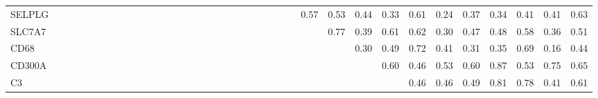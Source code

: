 \begin{longtable}{lrrrrrrrrrrrrrrrrrrrrrrrrrrrrrrrrrrrr}
SELPLG    &            &            &              &            &              &              &                 &               &              &            &           &             &              &             &            &             &              &           &           &              &               &            &               &               &              &         0.57 &       0.53 &         0.44 &     0.33 &         0.61 &          0.24 &        0.37 &      0.34 &        0.41 &        0.41 &        0.63 \\
SLC7A7    &            &            &              &            &              &              &                 &               &              &            &           &             &              &             &            &             &              &           &           &              &               &            &               &               &              &              &       0.77 &         0.39 &     0.61 &         0.62 &          0.30 &        0.47 &      0.48 &        0.58 &        0.36 &        0.51 \\
CD68      &            &            &              &            &              &              &                 &               &              &            &           &             &              &             &            &             &              &           &           &              &               &            &               &               &              &              &            &         0.30 &     0.49 &         0.72 &          0.41 &        0.31 &      0.35 &        0.69 &        0.16 &        0.44 \\
CD300A    &            &            &              &            &              &              &                 &               &              &            &           &             &              &             &            &             &              &           &           &              &               &            &               &               &              &              &            &              &     0.60 &         0.46 &          0.53 &        0.60 &      0.87 &        0.53 &        0.75 &        0.65 \\
C3        &            &            &              &            &              &              &                 &               &              &            &           &             &              &             &            &             &              &           &           &              &               &            &               &               &              &              &            &              &          &         0.46 &          0.46 &        0.49 &      0.81 &        0.78 &        0.41 &        0.61 \\

\end{longtable}
